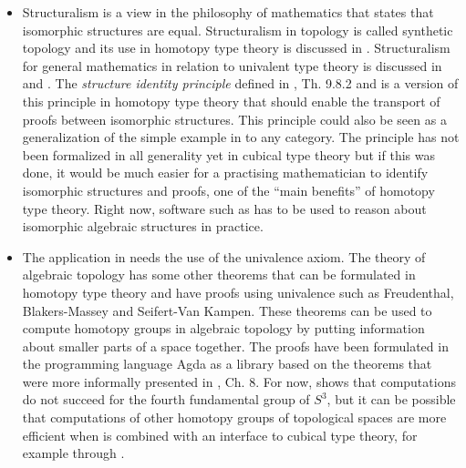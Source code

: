 \documentclass[12pt,a4paper,twoside,xetex]{book} %
\newcommand{\keyword}[1]{\emph{#1}\index{#1}}
\begin{document}
\begin{itemize}
\item Structuralism is a view in the philosophy of mathematics that states that isomorphic structures are equal. Structuralism in topology is called synthetic topology and its use in homotopy type theory is discussed in \cite{Shulman2017}. Structuralism for general mathematics in relation to univalent type theory is discussed in \cite{Awodey2014} and \cite{Tsementzis2016}. The \keyword{structure identity principle} defined in 
\cite{Voevodsky2013}, Th. 9.8.2 and \cite{Aczel2012} is a version of this principle in homotopy type theory that should enable the transport of proofs between isomorphic structures. This principle could also be seen as a 
generalization of the simple example in  to any category. The 
principle has not been formalized in all generality yet in cubical type theory 
but if this was done, it would be much easier for a practising mathematician to 
identify isomorphic structures and proofs, one of the ``main benefits'' of homotopy type theory. Right now, software such as \cite{TheGAPGroup2018} has to be used to reason about isomorphic algebraic structures in practice. 

\item The application in  needs the use of the univalence 
axiom. The theory of algebraic topology has some other theorems that can be 
formulated in homotopy type theory and have proofs using univalence such as 
Freudenthal, Blakers-Massey and Seifert-Van Kampen. These theorems can be used 
to compute homotopy groups in algebraic topology by putting information about 
smaller parts of a space together. The proofs have been formulated in the 
programming language Agda as a library \cite{HoBr17} based on the theorems that 
were more informally presented in \cite{Voevodsky2013}, Ch. 8. For now, 
 shows that computations do not succeed for the fourth 
fundamental group of $S^3$, but it can be possible that computations of other 
homotopy groups of topological spaces are more efficient when \cite{HoBr17} is 
combined with an interface to cubical type theory, for example through 
\cite{Moertberg2018}.



\end{itemize}
\end{document}
